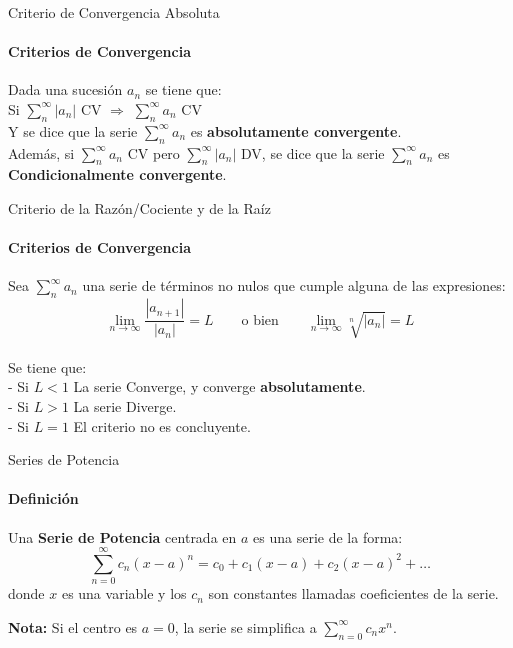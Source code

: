 \documentclass{plantillaPPT}
\begin{document}
\primeraDiapo

\begin{frame}{Criterio de Convergencia Absoluta}
\framesubtitle{Criterios de Convergencia}

Dada una sucesión \(a_n\) se tiene que:\\[2ex]
Si \(\displaystyle\sum_{n}^\infty |a_n|\) CV \(\Rightarrow\) \(\displaystyle\sum_{n}^\infty a_n\) CV\\[2ex]
Y se dice que la serie \(\displaystyle\sum_{n}^\infty a_n\) es \textbf{absolutamente convergente}.\\[4ex]
Además, si \(\displaystyle\sum_{n}^\infty a_n\) CV pero \(\displaystyle\sum_{n}^\infty |a_n|\) DV, se dice que la serie \(\displaystyle\sum_{n}^\infty a_n\) es \textbf{Condicionalmente convergente}.
\end{frame}

\begin{frame}{Criterio de la Razón/Cociente y de la Raíz}
\framesubtitle{Criterios de Convergencia}

Sea \(\displaystyle\sum_{n}^\infty a_n\) una serie de términos no nulos que cumple alguna de las expresiones:\\[2ex]

\[\lim_{n\to\infty}\frac{|a_{n+1}|}{|a_n|} = L \qquad \text{o bien} \qquad \lim_{n\to\infty}\sqrt[n]{|a_n|} = L\]\\[2ex]
Se tiene que:\\[2ex]
- Si \(L<1\) La serie Converge, y converge \textbf{absolutamente}. \\[2ex]
- Si \(L>1\) La serie Diverge.\\[2ex]
- Si \(L=1\) El criterio no es concluyente.
    
\end{frame}

\begin{frame}{Series de Potencia}
\framesubtitle{Definición}

\begin{definicion}
    Una \textbf{Serie de Potencia} centrada en $a$ es una serie de la forma:
    \[
    \sum_{n=0}^{\infty} c_n (x-a)^n = c_0 + c_1(x-a) + c_2(x-a)^2 + \dots
    \]
    donde $x$ es una variable y los $c_n$ son constantes llamadas coeficientes de la serie.
\end{definicion}

\textbf{Nota:} Si el centro es $a=0$, la serie se simplifica a $\sum_{n=0}^{\infty} c_n x^n$.
\end{frame}
\end{document}
